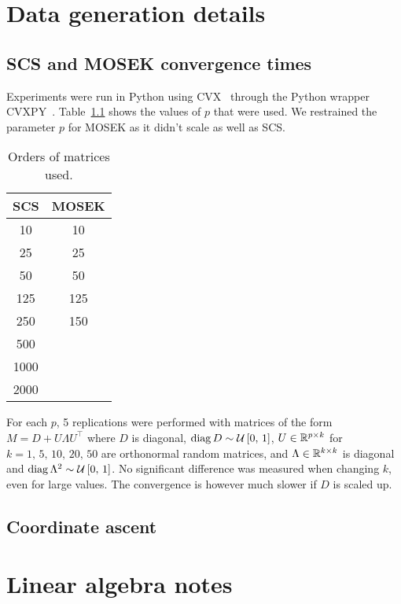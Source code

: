 \appendix
\chapter{Data generation details}\label{ch:appendix_data}

\section{SCS and MOSEK convergence times}\label{sec:cvx_times}

Experiments were run in Python using CVX~\cite{cvx} through the Python wrapper CVXPY~\cite{cvxpy}.
Table~\ref{tab:cvx_times_ps} shows the values of $p$ that were used.
We restrained the parameter $p$ for MOSEK as it didn't scale as well as SCS\@.
\begin{table}[!htb]
    \centering
    \setlength{\tabcolsep}{2pt}
    {\small
    \begin{tabular}{|c|c|}\hline
    \textbf{SCS} & \textbf{MOSEK}\\ \hline
        10 & 10\\ \hline
        25 & 25\\ \hline
        50 & 50\\ \hline
        125 & 125\\ \hline
        250 & 150\\ \hline
        500 &\\ \hline
        1000 &\\ \hline
        2000 &\\ \hline
    \end{tabular}
    }%
    \caption[short]{
        Orders of matrices used.
    }
    \label{tab:cvx_times_ps}
\end{table}
For each $p$, 5 replications were performed with matrices of the form $M = D + U \Lambda U^\top$ where $D$ is diagonal,
$\operatorname*{diag} D \sim \mathcal{U}\left[ 0,\, 1 \right]$, $U \in \mathbb{R}^{p \times k}$ for $k = 1,\, 5,\, 10,\, 20,\, 50$
are orthonormal random matrices, and $\Lambda \in \mathbb{R}^{k \times k}$ is diagonal and
$\operatorname*{diag} \Lambda^2 \sim \mathcal{U}\left[ 0,\, 1 \right]$.
No significant difference was measured when changing $k$, even for large values.
The convergence is however much slower if $D$ is scaled up.

\section{Coordinate ascent}\label{sec:coordinate_ascent_data}

\chapter{Linear algebra notes}\label{ch:linear_algebra}

